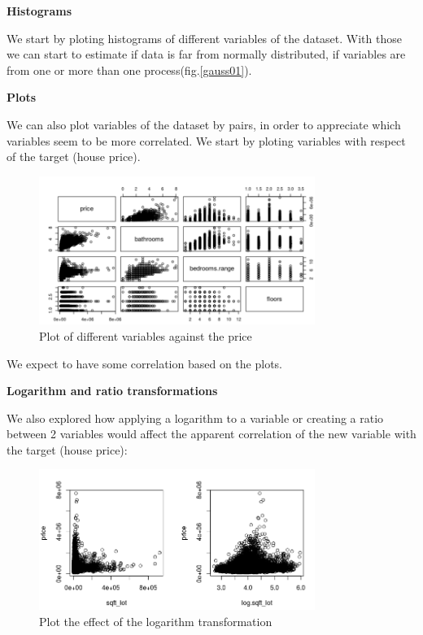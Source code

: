 \textbf{Histograms}

We start by ploting histograms of different variables of the dataset. With those we can start to estimate if data is far from normally distributed, if variables are from one or more than one process(fig.\ref{gauss01}).





\textbf{Plots}

We can also plot variables of the dataset by pairs, in order to appreciate which variables seem to be more correlated. 
We start by ploting variables with respect of the target (house price).

\begin{figure}[H]
    \centering
        \includegraphics[width=0.8\textwidth]{img/pairs01.png}
    \caption{Plot of different variables against the price }\label{fig:rf_sfs}
\end{figure}

We expect to have some correlation based on the plots.

\textbf{Logarithm and ratio transformations}

We also explored how applying a logarithm to a variable or creating a ratio between 2 variables would affect the apparent correlation of the new variable with the target (house price):
\begin{figure}[H]
    \centering
        \includegraphics[width=0.8\textwidth]{img/log02.png}
    \caption{Plot the effect of the logarithm transformation }\label{fig:rf_sfs}
\end{figure}

